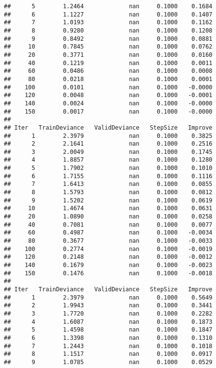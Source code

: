 \documentclass[]{article}
\begin{document}
\begin{verbatim}
##      5        1.2464             nan     0.1000    0.1684
##      6        1.1227             nan     0.1000    0.1407
##      7        1.0193             nan     0.1000    0.1162
##      8        0.9280             nan     0.1000    0.1208
##      9        0.8492             nan     0.1000    0.0881
##     10        0.7845             nan     0.1000    0.0762
##     20        0.3771             nan     0.1000    0.0160
##     40        0.1219             nan     0.1000    0.0011
##     60        0.0486             nan     0.1000    0.0008
##     80        0.0218             nan     0.1000    0.0001
##    100        0.0101             nan     0.1000   -0.0000
##    120        0.0048             nan     0.1000   -0.0001
##    140        0.0024             nan     0.1000   -0.0000
##    150        0.0017             nan     0.1000   -0.0000
## 
## Iter   TrainDeviance   ValidDeviance   StepSize   Improve
##      1        2.3979             nan     0.1000    0.3825
##      2        2.1641             nan     0.1000    0.2516
##      3        2.0049             nan     0.1000    0.1745
##      4        1.8857             nan     0.1000    0.1280
##      5        1.7902             nan     0.1000    0.1010
##      6        1.7155             nan     0.1000    0.1116
##      7        1.6413             nan     0.1000    0.0855
##      8        1.5793             nan     0.1000    0.0812
##      9        1.5202             nan     0.1000    0.0619
##     10        1.4674             nan     0.1000    0.0631
##     20        1.0890             nan     0.1000    0.0258
##     40        0.7081             nan     0.1000    0.0077
##     60        0.4987             nan     0.1000   -0.0034
##     80        0.3677             nan     0.1000   -0.0033
##    100        0.2774             nan     0.1000   -0.0019
##    120        0.2148             nan     0.1000   -0.0012
##    140        0.1679             nan     0.1000   -0.0023
##    150        0.1476             nan     0.1000   -0.0018
## 
## Iter   TrainDeviance   ValidDeviance   StepSize   Improve
##      1        2.3979             nan     0.1000    0.5649
##      2        1.9943             nan     0.1000    0.3441
##      3        1.7720             nan     0.1000    0.2282
##      4        1.6087             nan     0.1000    0.1873
##      5        1.4598             nan     0.1000    0.1847
##      6        1.3398             nan     0.1000    0.1310
##      7        1.2443             nan     0.1000    0.1018
##      8        1.1517             nan     0.1000    0.0917
##      9        1.0785             nan     0.1000    0.0529

\end{verbatim}
\end{document}
